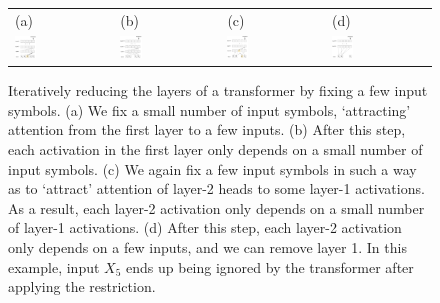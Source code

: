 \documentclass[11pt,a4paper]{article}
\begin{document}
\begin{figure}[ht]
    \centering
    \begin{tabular}{llll}
    (a) & (b) & (c) & (d) \\
    \includegraphics[width=0.23\textwidth]{figures/sa1.png} &
        \includegraphics[width=0.23\textwidth]{figures/sa2.png}&
    \includegraphics[width=0.23\textwidth]{figures/sa3.png} &
        \includegraphics[width=0.23\textwidth]{figures/sa4.png}
        \end{tabular}
	\caption{Iteratively reducing the layers of a transformer by fixing a few input symbols. (a) We fix a small number of input symbols, `attracting' attention from the first layer to a few inputs. (b) After this step, each activation in the first layer only depends on a small number of input symbols. (c) We again fix a few input symbols in such a way as to `attract' attention of layer-2 heads to some layer-1 activations. As a result, each layer-2 activation only depends on a small number of layer-1 activations. (d) After this step, each layer-2 activation only depends on a few inputs, and we can remove layer 1. In this example, input $X_5$ ends up being ignored by the transformer after applying the restriction.}
	\label{fig:depth-reduction}
\end{figure}
\end{document}
